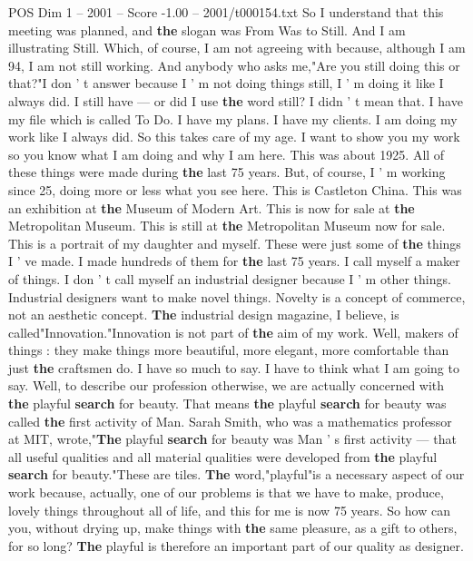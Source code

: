 \begin{textsample}{POS Dim 1 – 2001 – Score -1.00 – 2001/t000154.txt}  \label{ex:f1_pos_078}
So I understand that this meeting was planned, and \textbf{the} slogan was From Was to Still.
And I am illustrating Still.
Which, of course, I am not agreeing with because, although I am 94, I am not still working.
And anybody who asks me,"Are you still doing this or that?"I don ' t answer because I ' m not doing things still, I ' m doing it like I always did.
I still have — or did I use \textbf{the} word still?
I didn ' t mean that.
I have my file which is called To Do.
I have my plans.
I have my clients.
I am doing my work like I always did.
So this takes care of my age.
I want to show you my work so you know what I am doing and why I am here.
This was about 1925.
All of these things were made during \textbf{the} last 75 years.
But, of course, I ' m working since 25, doing more or less what you see here.
This is Castleton China.
This was an exhibition at \textbf{the} Museum of Modern Art.
This is now for sale at \textbf{the} Metropolitan Museum.
This is still at \textbf{the} Metropolitan Museum now for sale.
This is a portrait of my daughter and myself.
These were just some of \textbf{the} things I ' ve made.
I made hundreds of them for \textbf{the} last 75 years.
I call myself a maker of things.
I don ' t call myself an industrial designer because I ' m other things.
Industrial designers want to make novel things.
Novelty is a concept of commerce, not an aesthetic concept. \textbf{The} industrial design magazine, I believe, is called"Innovation."Innovation is not part of \textbf{the} aim of my work.
Well, makers of things : they make things more beautiful, more elegant, more comfortable than just \textbf{the} craftsmen do.
I have so much to say.
I have to think what I am going to say.
Well, to describe our profession otherwise, we are actually concerned with \textbf{the} playful \textbf{search} for beauty.
That means \textbf{the} playful \textbf{search} for beauty was called \textbf{the} first activity of Man.
Sarah Smith, who was a mathematics professor at MIT, wrote,"\textbf{The} playful \textbf{search} for beauty was Man ' s first activity — that all useful qualities and all material qualities were developed from \textbf{the} playful \textbf{search} for beauty."These are tiles. \textbf{The} word,"playful"is a necessary aspect of our work because, actually, one of our problems is that we have to make, produce, lovely things throughout all of life, and this for me is now 75 years.
So how can you, without drying up, make things with \textbf{the} same pleasure, as a gift to others, for so long? \textbf{The} playful is therefore an important part of our quality as designer.

\end{textsample}
